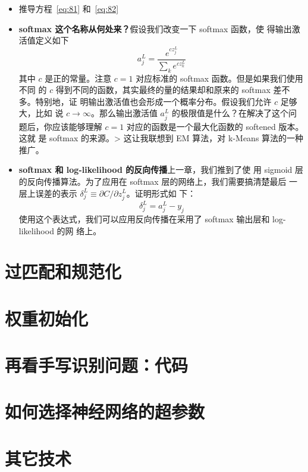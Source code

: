 \begin{itemize}
\item 推导方程~\eqref{eq:81} 和~\eqref{eq:82}
\item \textbf{softmax 这个名称从何处来？}\quad 假设我们改变一下 softmax 函数，使
  得输出激活值定义如下
  \begin{equation}
    a^L_j = \frac{e^{c z^L_j}}{\sum_k e^{c z^L_k}}
    \label{eq:83}\tag{83}
  \end{equation}
  其中 $c$ 是正的常量。注意 $c=1$ 对应标准的 softmax 函数。但是如果我们使用不同
  的 $c$ 得到不同的函数，其实最终的量的结果却和原来的 softmax 差不多。特别地，证
  明输出激活值也会形成一个概率分布。假设我们允许 $c$ 足够大，比如
  说 $c\rightarrow \infty$。那么输出激活值 $a_j^L$ 的极限值是什么？在解决了这个问
  题后，你应该能够理解 $c=1$ 对应的函数是一个最大化函数的 softened 版本。这就
  是 softmax 的来源。> 这让我联想到 EM 算法，对 k-Means 算法的一种推广。
\item \textbf{softmax 和 log-likelihood 的反向传播}\quad 上一章，我们推到了使
  用 sigmoid 层的反向传播算法。为了应用在 softmax 层的网络上，我们需要搞清楚最后
  一层上误差的表示 $\delta^L_j \equiv \partial C / \partial z^L_j$。证明形式如
  下：
  \begin{equation}
    \delta^L_j = a^L_j -y_j
    \label{eq:84}\tag{84}
  \end{equation}
  使用这个表达式，我们可以应用反向传播在采用了 softmax 输出层和 log-likelihood 的网
  络上。
\end{itemize}

\section{过匹配和规范化}
\label{sec:overfitting_and_regularization}


\section{权重初始化}
\label{sec:weight_initialization}

\section{再看手写识别问题：代码}
\label{sec:handwriting_recognition_revisited_the_code}

\section{如何选择神经网络的超参数}
\label{sec:how_to_choose_a_neural_network's_hyper-parameters}

\section{其它技术}
\label{sec:other_techniques}
